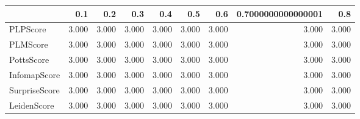 \begin{tabular}{lrrrrrrrr}
\toprule
{} &   0.1 &   0.2 &   0.3 &   0.4 &   0.5 &   0.6 & 0.7000000000000001 &   0.8 \\
\midrule
PLPScore      & 3.000 & 3.000 & 3.000 & 3.000 & 3.000 & 3.000 &              3.000 & 3.000 \\
PLMScore      & 3.000 & 3.000 & 3.000 & 3.000 & 3.000 & 3.000 &              3.000 & 3.000 \\
PottsScore    & 3.000 & 3.000 & 3.000 & 3.000 & 3.000 & 3.000 &              3.000 & 3.000 \\
InfomapScore  & 3.000 & 3.000 & 3.000 & 3.000 & 3.000 & 3.000 &              3.000 & 3.000 \\
SurpriseScore & 3.000 & 3.000 & 3.000 & 3.000 & 3.000 & 3.000 &              3.000 & 3.000 \\
LeidenScore   & 3.000 & 3.000 & 3.000 & 3.000 & 3.000 & 3.000 &              3.000 & 3.000 \\
\bottomrule
\end{tabular}

